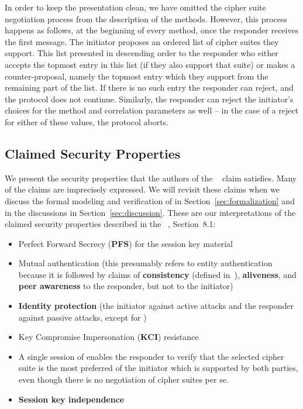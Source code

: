 In order to keep the presentation clean, we have omitted the cipher suite negotiation process from the description of the methods. However, this process happens as follows, at the beginning of every method, once the responder receives the first message. The initiator proposes an ordered list of cipher suites they support. This list presented in descending order to the responder who either accepts the topmost entry in this list (if they also support that suite) or makes a counter-proposal, namely the topmost entry which they support from the remaining part of the list. If there is no such entry the responder can reject, and the protocol does not continue. Similarly, the responder can reject the initiator's choices for the method and correlation parameters as well -- in the case of a reject for either of these values, the protocol aborts.

\subsection{Claimed Security Properties}
\label{sec:claimedProperties}
 
We present the security properties that the authors
of the \mSpec{}~\cite{selander-lake-edhoc-01} claim \mEdhoc{} satisfies.
%
Many of the claims are imprecisely expressed.
%
We will revisit these claims when we discuss the formal modeling and
verification of \mEdhoc{} in Section~\ref{sec:formalization} and in the
discussions in Section~\ref{sec:discussion}.
%
These are our interpretations of the claimed security properties described in
the \mSpec~\cite{selander-lake-edhoc-01}, Section~8.1:
\begin{itemize}
    \item Perfect Forward Secrecy (\textbf{PFS}) for the session key material
    \item Mutual authentication (this presumably refers to entity authentication
        because it is followed by claims of
        \textbf{consistency} (defined in~\cite{sigma}),
        \textbf{aliveness}, and
        \textbf{peer awareness} to the responder, but not to the initiator)
    \item \textbf{Identity protection} (the initiator against active attacks
        and the responder against passive attacks, except for \mPskPsk{})
    \item Key Compromise Impersonation (\textbf{KCI}) resistance
    \item A single session of \mEdhoc{} enables the responder to verify
            that the selected cipher suite is the most preferred of the
            initiator which is supported by both parties, even though there is
            no negotiation of cipher suites per se.
    \item \textbf{Session key independence}
\end{itemize}

